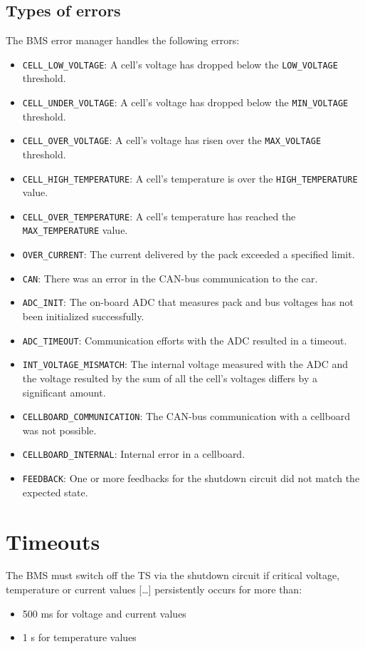 \subsection{Types of errors}
The BMS error manager handles the following errors:
\begin{itemize}
	\item \texttt{CELL\_LOW\_VOLTAGE}: A cell's voltage has dropped below the \texttt{LOW\_VOLTAGE} threshold.
	\item \texttt{CELL\_UNDER\_VOLTAGE}: A cell's voltage has dropped below the \texttt{MIN\_VOLTAGE} threshold.
	\item \texttt{CELL\_OVER\_VOLTAGE}: A cell's voltage has risen over the \texttt{MAX\_VOLTAGE} threshold.
	\item \texttt{CELL\_HIGH\_TEMPERATURE}: A cell's temperature is over the \texttt{HIGH\_TEMPERATURE} value.
	\item \texttt{CELL\_OVER\_TEMPERATURE}: A cell's temperature has reached the \texttt{MAX\_TEMPERATURE} value.
	\item \texttt{OVER\_CURRENT}: The current delivered by the pack exceeded a specified limit.
	\item \texttt{CAN}: There was an error in the CAN-bus communication to the car.
	\item \texttt{ADC\_INIT}: The on-board ADC that measures pack and bus voltages has not been initialized successfully.
	\item \texttt{ADC\_TIMEOUT}: Communication efforts with the ADC resulted in a timeout.
	\item \texttt{INT\_VOLTAGE\_MISMATCH}: The internal voltage measured with the ADC and the voltage resulted by the sum of all the cell's voltages differs by a significant amount.
	\item \texttt{CELLBOARD\_COMMUNICATION}: The CAN-bus communication with a cellboard was not possible.
	\item \texttt{CELLBOARD\_INTERNAL}: Internal error in a cellboard.
	\item \texttt{FEEDBACK}: One or more feedbacks for the shutdown circuit did not match the expected state.
\end{itemize}

\section{Timeouts}

\begin{displayquote}
	The BMS must switch off the TS via the shutdown circuit if critical voltage, temperature
	or current values [\dots] persistently occurs for more than:
	\begin{itemize}
		\item 500 ms for voltage and current values
		\item 1 s for temperature values
	\end{itemize}
	\label{quote:586}
\end{displayquote}

